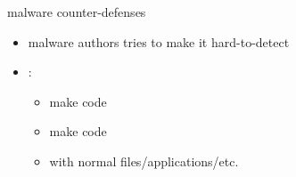 \begin{frame}{malware counter-defenses}
    \begin{itemize}
    \item malware authors tries to make it hard-to-detect
    \item {}:
        \begin{itemize}
        \item make code 
        \item make code 
        \item {} with normal files/applications/etc.
        \end{itemize}
    \end{itemize}
\end{frame}


